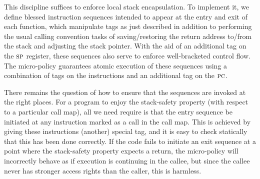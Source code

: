 \documentclass[acmsmall,review,anonymous]{acmart}\settopmatter{printfolios=true,printccs=false,printacmref=false}
\newcommand*{\rsp}{\textsc{sp}}
\begin{document}
This discipline suffices to enforce local stack encapsulation.
To implement it,  we define blessed instruction sequences
intended to appear at the entry and exit of each function,
which manipulate tags as just described in addition to performing the
usual calling convention tasks of saving/restoring the return address to/from
the stack and adjusting the stack pointer. With the aid of an additional tag on
the $\rsp$ register, these sequences also serve to enforce
well-bracketed control flow.
The micro-policy guarantees atomic execution of these sequences
using a combination of tags on the instructions
and an additional tag on the $\textsc{pc}$.

There remains the question of how to ensure that the sequences are
invoked at the right places. For a program to enjoy the stack-safety property
(with respect to a particular call map), all we need require is that
the entry sequence be initiated at any instruction marked as a call
in the call map. This is achieved by giving these instructions (another) special tag,
and it is easy to check statically that this has been done correctly.
If the code fails to initiate an exit
sequence at a point where the stack-safety property expects a return,
the micro-policy will incorrectly behave as if execution
is continuing in the callee, but since the callee never has stronger access
rights than the caller, this is harmless.

\end{document}
